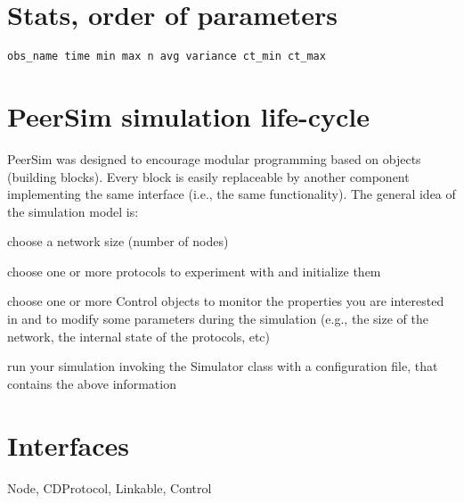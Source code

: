 \section{Stats, order of parameters}
\texttt{obs\_name time min max n avg variance ct\_min ct\_max}

\section{PeerSim simulation life-cycle}

PeerSim was designed to encourage modular programming based on objects (building blocks). Every block is easily replaceable by another component implementing the same interface (i.e., the same functionality). The general idea of the simulation model is:\\

\begin{compactenum}
\item choose a network size (number of nodes)
\item choose one or more protocols to experiment with and initialize them
\item choose one or more Control objects to monitor the properties you are interested in and to modify some parameters during the simulation (e.g., the size of the network, the internal state of the protocols, etc)
\item run your simulation invoking the Simulator class with a configuration file, that contains the above information
\end{compactenum}

\section{Interfaces}
Node, CDProtocol, Linkable, Control
